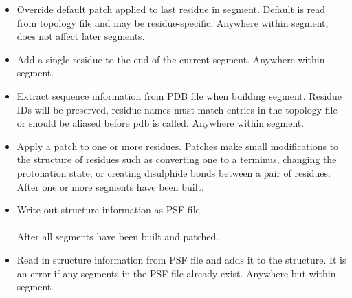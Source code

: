 \begin{itemize}
\item {}
{Override default patch applied to last residue in segment.
Default is read from topology file and may be residue-specific.}
{}
{Anywhere within segment, does not affect later segments.}

\item {}
{Add a single residue to the end of the current segment.}
{
}
{Anywhere within segment.}

\item {}
{Extract sequence information from PDB file when building segment.
Residue IDs will be preserved, residue names must match entries in
the topology file or should be aliased before pdb is called.}
{}
{Anywhere within segment.}

\item {}
{Apply a patch to one or more residues.  Patches make small modifications to
the structure of residues such as converting one to a terminus, changing the
protonation state, or creating disulphide bonds between a pair of residues.}
{\\
}
{After one or more segments have been built.}

\item {}
{Write out structure information as PSF file.}
{ \\
\\
}
{After all segments have been built and patched.}

\item {}
{Read in structure information from PSF file and adds it to the structure.
It is an error if any segments in the PSF file already exist.}
{}
{Anywhere but within segment.}


\end{itemize}
